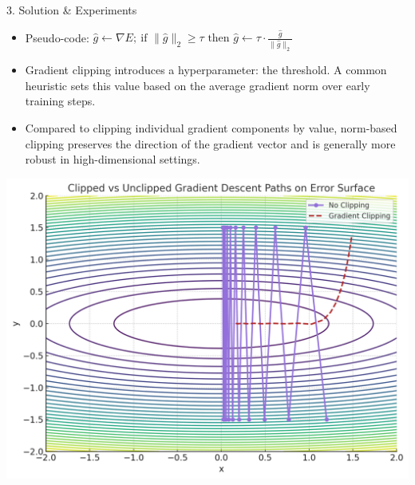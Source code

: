 \begin{frame}[t]
\begin{columns}[t,totalwidth=\textwidth]
\begin{column}{0.33\textwidth}
\begin{block}{3. Solution \& Experiments}
        \begin{minipage}{0.54\textwidth}
        \begin{itemize}
          \item Pseudo-code: $\hat{g} \leftarrow \nabla E;\ \text{if } \|\hat{g}\|_2 \geq \tau \text{ then } \hat{g} \leftarrow \tau \cdot \frac{\hat{g}}{\|\hat{g}\|_2}$
          \item Gradient clipping introduces a hyperparameter: the threshold. A common heuristic sets this value based on the average gradient norm over early training steps.
          \item Compared to clipping individual gradient components by value, norm-based clipping preserves the direction of the gradient vector and is generally more robust in high-dimensional settings.
        \end{itemize}
        \end{minipage}
        \hfill
        \begin{minipage}{0.42\textwidth}
        \centering
        \vspace{1em} %
        \includegraphics[width=\linewidth]{figures/gradient_clipping.png}
        \\[-0.3em]
        \end{minipage}


\end{block}
\end{column}
\end{columns}
\end{frame}
